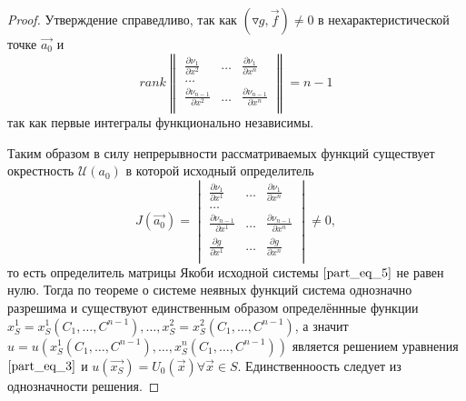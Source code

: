 \documentclass[a4paper, 12pt]{article}
\begin{document}
\begin{proof}
        Утверждение справедливо, так как $ \left( \triangledown g, \overrightarrow{f} \right) \neq 0$ в нехарактеристической точке $\overrightarrow{a_0}$ и
        \begin{equation*}
            rank
            \begin{Vmatrix}
                \frac{\partial \nu_1}{\partial x^2} & \dots & \frac{\partial \nu_1}{\partial x^n}             \\
                \dots                                                                                         \\
                \frac{\partial \nu_{n - 1}}{\partial x^2} & \dots & \frac{\partial \nu_{n - 1}}{\partial x^n} \\
            \end{Vmatrix} = n - 1
        \end{equation*}
        так как первые интегралы функционально независимы.

        Таким образом в силу непрерывности рассматриваемых функций существует окрестность $\mathcal{U} \left( a_0 \right)$ в которой исходный определитель
        \begin{equation*}
            J \left( \overrightarrow{a_0} \right) =
            \begin{vmatrix}
                \frac{\partial \nu_1}{\partial x^1} & \dots & \frac{\partial \nu_1}{\partial x^n}             \\
                \dots                                                                                         \\
                \frac{\partial \nu_{n - 1}}{\partial x^1} & \dots & \frac{\partial \nu_{n - 1}}{\partial x^n} \\
                \frac{\partial g}{\partial x^1} & \dots & \frac{\partial g}{\partial x^n}                     \\
            \end{vmatrix} \neq 0,
        \end{equation*}
        то есть определитель матрицы Якоби исходной системы $\eqref{part_eq_5}$ не равен нулю. Тогда по теореме о системе неявных функций система однозначно разрешима и существуют единственным образом определённные функции $x^1_S = x^1_S \left( C_1, \dots, C^{n - 1} \right), \dots, x^2_S = x^2_S \left( C_1, \dots, C^{n - 1} \right)$, а значит $u = u \left( x^1_S \left( C_1, \dots, C^{n - 1} \right), \dots, x^n_S \left( C_1, \dots, C^{n - 1} \right) \right)$ является решением уравнения $\eqref{part_eq_3}$ и $u \left( \overrightarrow{x_S} \right) = U_0 \left( \overrightarrow{x} \right) \forall \overrightarrow{x} \in S$. Единственноость следует из однозначности решения.

    \end{proof}
\end{document}
